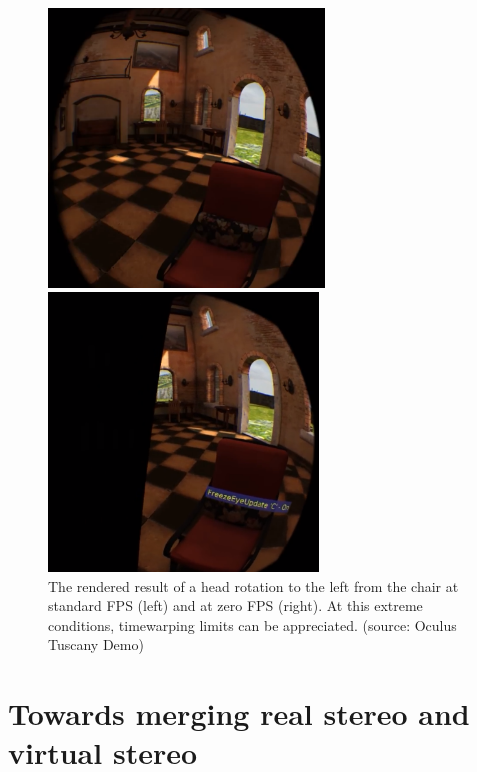 \begin{figure} 
\centering   
\begin{minipage}[t]{0.49\textwidth}
\includegraphics[width=\linewidth, height=7.4cm]{pictures/non-timewarped-chair}
\end{minipage}
\begin{minipage}[t]{0.49\textwidth}
\includegraphics[width=\linewidth, height=7.4cm]{pictures/timewarped-chair}
\end{minipage}
\caption{The rendered result of a head rotation to the left from the chair at standard FPS (left) and at zero FPS (right). At this extreme conditions, timewarping limits can be appreciated. (source: Oculus Tuscany Demo)}
\label{fig:timewarp_example}
\end{figure}

\section{Towards merging real stereo and virtual stereo}


